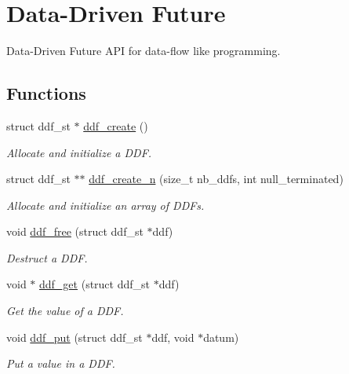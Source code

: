 \hypertarget{group__DDF}{\section{Data-\/\-Driven Future}
\label{group__DDF}
}


Data-\/\-Driven Future A\-P\-I for data-\/flow like programming.  


\subsection*{Functions}
\begin{DoxyCompactItemize}
\item 
struct ddf\-\_\-st $\ast$ \hyperlink{group__DDF_ga1f3ff836187714d3d9bc4b91156e1367}{ddf\-\_\-create} ()
\begin{DoxyCompactList}\small\item\em Allocate and initialize a D\-D\-F. \end{DoxyCompactList}\item 
struct ddf\-\_\-st $\ast$$\ast$ \hyperlink{group__DDF_gaf106a3ec992acb7a2826121363bf2bb2}{ddf\-\_\-create\-\_\-n} (size\-\_\-t nb\-\_\-ddfs, int null\-\_\-terminated)
\begin{DoxyCompactList}\small\item\em Allocate and initialize an array of D\-D\-Fs. \end{DoxyCompactList}\item 
void \hyperlink{group__DDF_gae31ccd9f09079eceb790ae8be0475424}{ddf\-\_\-free} (struct ddf\-\_\-st $\ast$ddf)
\begin{DoxyCompactList}\small\item\em Destruct a D\-D\-F. \end{DoxyCompactList}\item 
void $\ast$ \hyperlink{group__DDF_ga1eb3de562ba809f11f30c776dbd11023}{ddf\-\_\-get} (struct ddf\-\_\-st $\ast$ddf)
\begin{DoxyCompactList}\small\item\em Get the value of a D\-D\-F. \end{DoxyCompactList}\item 
void \hyperlink{group__DDF_ga0ba04096262350591d907abc8b1e7ed2}{ddf\-\_\-put} (struct ddf\-\_\-st $\ast$ddf, void $\ast$datum)
\begin{DoxyCompactList}\small\item\em Put a value in a D\-D\-F. \end{DoxyCompactList}\end{DoxyCompactItemize}


